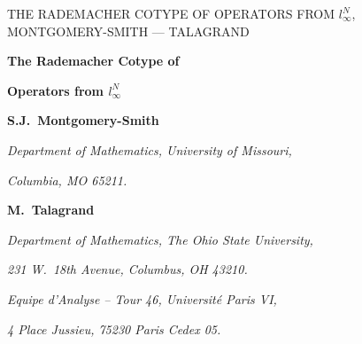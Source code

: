 \def\set#1{\{1$, $2,\ldots,$\ $#1\}}

\def\lnorm{\left\|}
\def\rnorm{\right\|}
\def\normo#1{\lnorm #1 \rnorm}
\def\widedot{\,\cdot\,}
\def\normdot{\normo{\widedot}}

\def\lmod{\left|}
\def\rmod{\right|}
\def\modo#1{\lmod #1 \rmod}

\def\angleo#1{\left\langle #1 \right\rangle}


\def\F{{\cal F}}
\def\cN{{\cal N}}

\def\invN{{1\over N}}
\def\kot{{k\over2}}

\def\TliNY{T:\liN\to Y}
\def\TCKY{T:C(K)\to Y}
\def\TXY{T:X\to Y}

\def\pitoT{\pi_{2,1}(T)}
\def\pipqT{\pi_{p,q}(T)}
\def\pitT{\pi_2(T)}
\def\pipT{\pi_p(T)}
\def\betatT{\beta^{(2)}(T)}
\def\betapT{\beta^{(p)}(T)}
\def\KtT{K^{(2)}(T)}
\def\KpT{K^{(p)}(T)}

\def\bx{\bar{x}}

\def\xS{\list x,S}
\def\epsilonlist{\lists\varepsilon}
\def\gammalist{\lists\gamma}
\def\bxS{\list{\bx},S}
\def\yS{\list y,S}
\def\zS{\list z,S}

\def\liN{{l_\infty^N}}
\def\LtoN{{L_{2,1}^N}}
\def\Lpq{{L_{p,q}}}
\def\LqpN{{L_{q,p}^N}}
\def\LqN{{L^N_q}}

\def\sumS{\sum_{s=1}^S}
\def\sumN{\sum_{n=1}^N}
\def\supS{\sup_{1\le s\le S}}

\def\randwalk#1{\normo{\sumS #1_s x_s}}
\def\Bernwalk{\randwalk\varepsilon}
\def\Gausswalk{\randwalk\gamma}
\def\Gausswalki{\Gausswalk_\infty}
\def\Bernwalki{\Bernwalk_\infty}

\def\rootmean#1,#2,#3,#4{\left(\sumS\normo{#1}_{#2}^{#3}\right)^#4}
\def\rmsxsLtoN{\rootmean x_s,\LtoN,2,\half}
\def\pthmpTxs{\rootmean T(x_s),,p,\invp}

\def\rmsmodxs{\left(\sumS\modo{x_s}^2\right)^\half}

\def\wkqnormxs{\sup \left\{ \left( \sumS \modo{\angleo{x^*,x_s}}^q
               \right)^\invq \right\} }


\setheadline THE RADEMACHER COTYPE OF OPERATORS FROM $l_\infty^N$,
             MONTGOMERY-SMITH --- TALAGRAND

\finalversion

{
\seventeensize
\centerline{\bf The Rademacher Cotype of}
\centerline{\bf Operators from $\liN$}
}
\bigskip\bigskip
\centerline{\bf S.J.~Montgomery-Smith}
{
\sevensize\baselineskip=4.0mm
\centerline{\it Department of Mathematics, University of Missouri,}
\centerline{\it Columbia, MO 65211.}
}
\medskip
\centerline{\bf M.~Talagrand}
{\sevensize\baselineskip=4.0mm
\centerline{\it Department of Mathematics, The Ohio State University,}
\centerline{\it 231 W.\ 18th Avenue, Columbus, OH 43210.}
\vskip 1pt
\centerline{\it Equipe d'Analyse -- Tour 46, Universit\'e Paris VI,}
\centerline{\it 4 Place Jussieu, 75230 Paris Cedex 05.}
}
\bigskip

